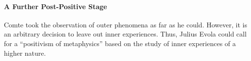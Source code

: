 \paragraph{A Further Post-Positive Stage}


Comte took the observation of outer phenomena as far as he could. However, it is an arbitrary decision to leave out inner experiences. Thus, Julius Evola could call for a ``positivism of metaphysics'' based on the study of inner experiences of a higher nature.



